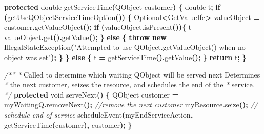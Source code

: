 \documentclass[
]{book}
\newenvironment{Shaded}{\begin{snugshade}}{\end{snugshade}}
\newcommand{\BuiltInTok}[1]{#1}
\newcommand{\CommentTok}[1]{\textcolor[rgb]{0.56,0.35,0.01}{\textit{#1}}}
\newcommand{\ControlFlowTok}[1]{\textcolor[rgb]{0.13,0.29,0.53}{\textbf{#1}}}
\newcommand{\DataTypeTok}[1]{\textcolor[rgb]{0.13,0.29,0.53}{#1}}
\newcommand{\FunctionTok}[1]{\textcolor[rgb]{0.00,0.00,0.00}{#1}}
\newcommand{\KeywordTok}[1]{\textcolor[rgb]{0.13,0.29,0.53}{\textbf{#1}}}
\newcommand{\NormalTok}[1]{#1}
\newcommand{\OperatorTok}[1]{\textcolor[rgb]{0.81,0.36,0.00}{\textbf{#1}}}
\newcommand{\StringTok}[1]{\textcolor[rgb]{0.31,0.60,0.02}{#1}}
\theoremstyle{definition}
\theoremstyle{definition}
\theoremstyle{definition}
\theoremstyle{definition}
\theoremstyle{remark}
\begin{document}
\begin{Shaded}
\begin{Highlighting}[]
    \KeywordTok{protected} \DataTypeTok{double} \FunctionTok{getServiceTime}\OperatorTok{(}\NormalTok{QObject customer}\OperatorTok{)} \OperatorTok{\{}
        \DataTypeTok{double}\NormalTok{ t}\OperatorTok{;}
        \ControlFlowTok{if} \OperatorTok{(}\FunctionTok{getUseQObjectServiceTimeOption}\OperatorTok{())} \OperatorTok{\{}
\NormalTok{            Optional}\OperatorTok{\textless{}}\NormalTok{GetValueIfc}\OperatorTok{\textgreater{}}\NormalTok{ valueObject }\OperatorTok{=}\NormalTok{ customer}\OperatorTok{.}\FunctionTok{getValueObject}\OperatorTok{();}
            \ControlFlowTok{if} \OperatorTok{(}\NormalTok{valueObject}\OperatorTok{.}\FunctionTok{isPresent}\OperatorTok{())\{}
\NormalTok{                t }\OperatorTok{=}\NormalTok{ valueObject}\OperatorTok{.}\FunctionTok{get}\OperatorTok{().}\FunctionTok{getValue}\OperatorTok{();}
            \OperatorTok{\}} \ControlFlowTok{else} \OperatorTok{\{}
                \ControlFlowTok{throw} \KeywordTok{new} \BuiltInTok{IllegalStateException}\OperatorTok{(}\StringTok{"Attempted to use QObject.getValueObject() when no object was set"}\OperatorTok{);}
            \OperatorTok{\}}
        \OperatorTok{\}} \ControlFlowTok{else} \OperatorTok{\{}
\NormalTok{            t }\OperatorTok{=} \FunctionTok{getServiceTime}\OperatorTok{().}\FunctionTok{getValue}\OperatorTok{();}
        \OperatorTok{\}}
        \ControlFlowTok{return}\NormalTok{ t}\OperatorTok{;}
    \OperatorTok{\}}

    \CommentTok{/**}
     \CommentTok{*}\NormalTok{ Called to determine which waiting QObject will be served next Determines}
     \CommentTok{*}\NormalTok{ the next customer}\CommentTok{,}\NormalTok{ seizes the resource}\CommentTok{,}\NormalTok{ and schedules the end of the}
     \CommentTok{*}\NormalTok{ service}\CommentTok{.}
     \CommentTok{*/}
    \KeywordTok{protected} \DataTypeTok{void} \FunctionTok{serveNext}\OperatorTok{()} \OperatorTok{\{}
\NormalTok{        QObject customer }\OperatorTok{=}\NormalTok{ myWaitingQ}\OperatorTok{.}\FunctionTok{removeNext}\OperatorTok{();} \CommentTok{//remove the next customer}
\NormalTok{        myResource}\OperatorTok{.}\FunctionTok{seize}\OperatorTok{();}
        \CommentTok{// schedule end of service}
        \FunctionTok{scheduleEvent}\OperatorTok{(}\NormalTok{myEndServiceAction}\OperatorTok{,} \FunctionTok{getServiceTime}\OperatorTok{(}\NormalTok{customer}\OperatorTok{),}\NormalTok{ customer}\OperatorTok{);}
    \OperatorTok{\}}


\end{Highlighting}
\end{Shaded}
\end{document}
